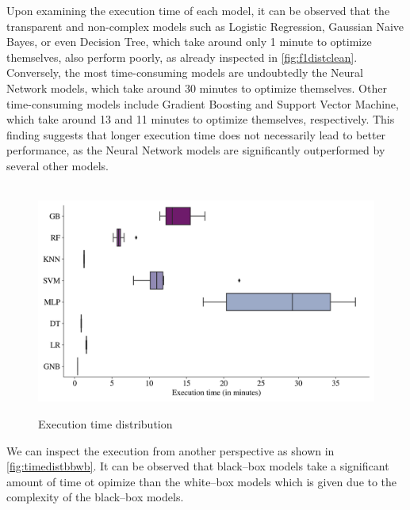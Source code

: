 Upon examining the execution time of each model, it can be observed that the transparent and non-complex models such as Logistic Regression, Gaussian Naive Bayes, or even Decision Tree, which take around only 1 minute to optimize themselves, also perform poorly, as already inspected in \autoref{fig:f1distclean}.
Conversely, the most time-consuming models are undoubtedly the Neural Network models, which take around 30 minutes to optimize themselves. Other time-consuming models include Gradient Boosting and Support Vector Machine, which take around 13 and 11 minutes to optimize themselves, respectively.
This finding suggests that longer execution time does not necessarily lead to better performance, as the Neural Network models are significantly outperformed by several other models.
\begin{figure}[H]
\centering
\caption{Execution time distribution}\vspace{0.5em}
\label{fig:timedist}\
\includegraphics[width=140mm]{Figures/EXECUTION_TIME_Distribution.jpg}
\centering{\begin{source}Author's results in Python\end{source}}\vspace{-1em}
\end{figure}
We can inspect the execution from another perspective as shown in \autoref{fig:timedistbbwb}.
It can be observed that black--box models take a significant amount of time ot opimize than the white--box models which is given due to the complexity of the black--box models.
